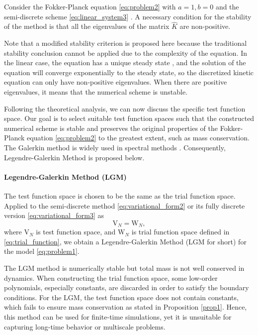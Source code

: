 \begin{proposition}[Stability]\label{prop2}
    Consider the Fokker-Planck equation \eqref{eq:problem2} with $a=1, b=0$ and the semi-discrete scheme \eqref{eq:linear_system3} . A necessary condition for the stability of the method is that all the eigenvalues of the matrix $\hat{K}$ are non-positive.
\end{proposition}
Note that a modified stability criterion is proposed here because the traditional stability conclusion cannot be applied due to the complexity of the equation. In the linear case, the equation has a unique steady state \cite{caceres2011analysis}, and the solution of the equation will converge exponentially to the steady state, so the discretized kinetic equation can only have non-positive eigenvalues. When there are positive eigenvalues, it means that the numerical scheme is unstable.

Following the theoretical analysis, we can now discuss the specific test function space. Our goal is to select suitable test function spaces such that the constructed numerical scheme is stable and preserves the original properties of the Fokker-Planck equation \eqref{eq:problem2} to the greatest extent, such as mass conservation. The Galerkin method is widely used in spectral methods \cite{shen2011spectral}. Consequently, Legendre-Galerkin Method is proposed below.
\paragraph{Legendre-Galerkin Method (LGM)}
The test function space is chosen to be the same as the trial function space. Applied to the semi-discrete method \eqref{eq:variational_form2} or its fully discrete version \eqref{eq:variational_form3} as 
\begin{equation}
    \mathrm{V}_N=\mathrm{W}_N,
\end{equation}
where $\mathrm{V}_N$ is test function space, and $\mathrm{W}_N$ is trial function space defined in \eqref{eq:trial_function}, we obtain a Legendre-Galerkin Method (LGM for short) for the model \eqref{eq:problem1}. 

The LGM method is numerically stable but total mass is not well conserved in dynamics. When constructing the trial function space, some low-order polynomials, especially constants, are discarded in order to satisfy the boundary conditions. For the LGM, the test function space does not contain constants, which fails to ensure mass conservation as stated in Proposition \ref{prop1}. Hence, this method can be used for  finite-time simulations, yet it is unsuitable for capturing long-time behavior or multiscale problems.


